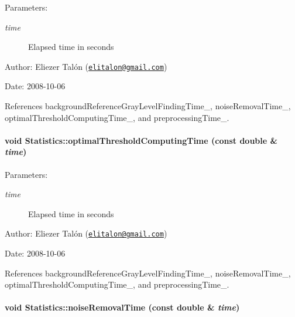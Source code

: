 \begin{Desc}
\item[Parameters:]
\begin{description}
\item[{\em time}]Elapsed time in seconds\end{description}
\end{Desc}
\begin{Desc}
\item[Author:]Eliezer Talón (\href{mailto:elitalon@gmail.com}{\tt elitalon@gmail.com}) \end{Desc}
\begin{Desc}
\item[Date:]2008-10-06 \end{Desc}


References backgroundReferenceGrayLevelFindingTime\_\-, noiseRemovalTime\_\-, optimalThresholdComputingTime\_\-, and preprocessingTime\_\-.\hypertarget{class_statistics_eed35a930f29f4596f3715306e1e1dbc}{
\paragraph[optimalThresholdComputingTime]{\setlength{\rightskip}{0pt plus 5cm}void Statistics::optimalThresholdComputingTime (const double \& {\em time})}\hfill}
\label{class_statistics_eed35a930f29f4596f3715306e1e1dbc}


\begin{Desc}
\item[Parameters:]
\begin{description}
\item[{\em time}]Elapsed time in seconds\end{description}
\end{Desc}
\begin{Desc}
\item[Author:]Eliezer Talón (\href{mailto:elitalon@gmail.com}{\tt elitalon@gmail.com}) \end{Desc}
\begin{Desc}
\item[Date:]2008-10-06 \end{Desc}


References backgroundReferenceGrayLevelFindingTime\_\-, noiseRemovalTime\_\-, optimalThresholdComputingTime\_\-, and preprocessingTime\_\-.\hypertarget{class_statistics_4ad24aec4e5491b7d3afca143e6deb05}{
\paragraph[noiseRemovalTime]{\setlength{\rightskip}{0pt plus 5cm}void Statistics::noiseRemovalTime (const double \& {\em time})}\hfill}
\label{class_statistics_4ad24aec4e5491b7d3afca143e6deb05}


